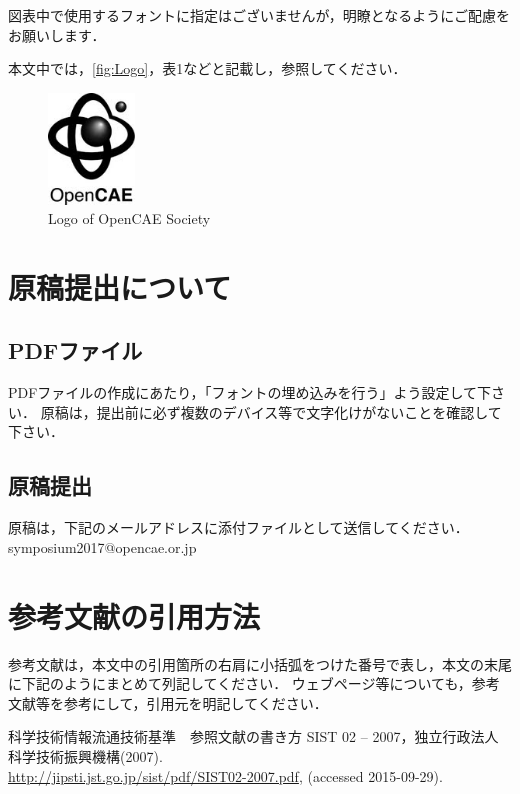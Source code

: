 \documentclass{ltjoc}
\begin{document}
図表中で使用するフォントに指定はございませんが，明瞭となるようにご配慮をお願いします．

本文中では，\autoref{fig:Logo}，表1などと記載し，参照してください．

\begin{figure}[htbp]
  \begin{center}
    \includegraphics[width=23mm]{fig/Logo-b3.jpg}
    \caption{Logo of OpenCAE Society}
  \label{fig:Logo}
  \end{center}
\end{figure}
%
\zh
\section{原稿提出について}
\subsection{PDFファイル}
PDFファイルの作成にあたり，「フォントの埋め込みを行う」よう設定して下さい．
原稿は，提出前に必ず複数のデバイス等で文字化けがないことを確認して下さい．
\subsection{原稿提出}
原稿は，下記のメールアドレスに添付ファイルとして送信してください．\\
\hfill
symposium2017@opencae.or.jp
%
\zh
\section{参考文献の引用方法}
参考文献は，本文中の引用箇所の右肩に小括弧をつけた番号で表し，本文の末尾に下記のようにまとめて列記してください．
ウェブページ等についても，参考文献\cite{SIST02-200}等を参考にして，引用元を明記してください．
%
\zh
\begin{thebibliography}{9}
科学技術情報流通技術基準　参照文献の書き方 SIST 02 – 2007，独立行政法人科学技術振興機構(2007).\\
\href{http://jipsti.jst.go.jp/sist/pdf/SIST02-2007.pdf}{http://jipsti.jst.go.jp/sist/pdf/SIST02-2007.pdf},
(accessed 2015-09-29).
\end{thebibliography}
%
\end{document}
